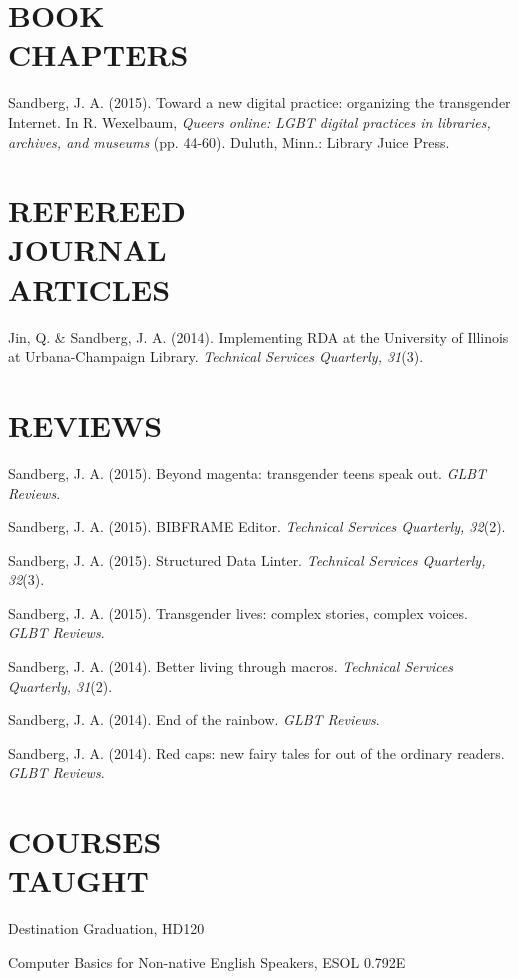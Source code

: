 \documentclass[line,margin]{res}
\begin{document}
\begin{resume}
    \newpage
\section{BOOK \\ CHAPTERS}
      Sandberg, J. A. (2015). Toward a new digital practice: organizing the transgender Internet. In R. Wexelbaum, \emph{Queers online: LGBT digital practices in libraries, archives, and museums} (pp. 44-60). Duluth, Minn.: Library Juice Press.

\section{REFEREED \\ JOURNAL \\ ARTICLES}
      Jin, Q. \& Sandberg, J. A. (2014). Implementing RDA at the University of Illinois at Urbana-Champaign Library.  \emph{Technical Services Quarterly, 31}(3).

\section{REVIEWS}
      Sandberg, J. A. (2015). Beyond magenta: transgender teens speak out.  \emph{GLBT Reviews}.

      Sandberg, J. A. (2015). BIBFRAME Editor. \emph{Technical Services Quarterly, 32}(2).

      Sandberg, J. A. (2015). Structured Data Linter.  \emph{Technical Services Quarterly, 32}(3).

      Sandberg, J. A. (2015). Transgender lives: complex stories, complex voices.  \emph{GLBT Reviews}.

      Sandberg, J. A. (2014). Better living through macros.  \emph{Technical Services Quarterly, 31}(2).

      Sandberg, J. A. (2014). End of the rainbow.  \emph{GLBT Reviews}.

      Sandberg, J. A. (2014). Red caps: new fairy tales for out of the ordinary readers.  \emph{GLBT Reviews}.



\section{COURSES \\ TAUGHT}
Destination Graduation, HD120

Computer Basics for Non-native English Speakers, ESOL 0.792E

\vspace{12pt}

\end{resume}
\end{document}
